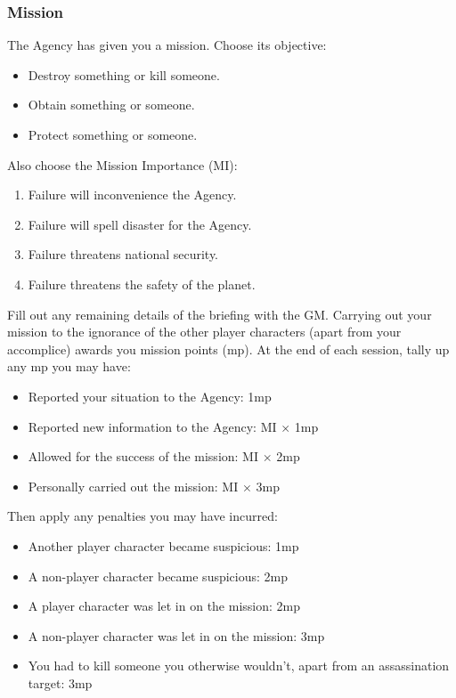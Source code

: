 \subsubsection{Mission}
The Agency has given you a mission. Choose its objective:
\begin{itemize}
\item Destroy something or kill someone.
\item Obtain something or someone.
\item Protect something or someone.
\end{itemize}

Also choose the Mission Importance (MI):
\begin{enumerate}
\item Failure will inconvenience the Agency.
\item Failure will spell disaster for the Agency.
\item Failure threatens national security.
\item Failure threatens the safety of the planet.
\end{enumerate}

Fill out any remaining details of the briefing with the GM. Carrying
out your mission to the ignorance of the other player characters
(apart from your accomplice) awards you mission points (mp). At the
end of each session, tally up any mp you may have:

\begin{itemize}
\item Reported your situation to the Agency: 1mp
\item Reported new information to the Agency: MI $\times$ 1mp
\item Allowed for the success of the mission: MI $\times$ 2mp
\item Personally carried out the mission: MI $\times$ 3mp
\end{itemize}

Then apply any penalties you may have incurred:
\begin{itemize}
\item Another player character became suspicious: 1mp
\item A non-player character became suspicious: 2mp
\item A player character was let in on the mission: 2mp
\item A non-player character was let in on the mission: 3mp
\item You had to kill someone you otherwise wouldn't, apart from an assassination target: 3mp
\end{itemize}

